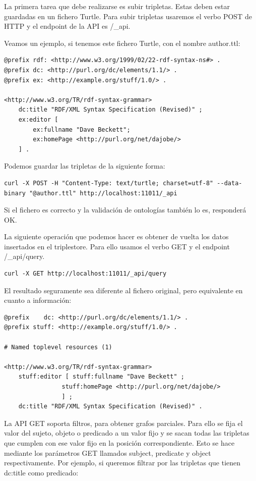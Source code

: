 \documentclass[12pt]{report} %
\begin{document}
La primera tarea que debe realizarse es subir tripletas. Estas deben estar guardadas en un fichero Turtle. Para subir tripletas usaremos el verbo POST de HTTP y el endpoint de la API es /\_api.

Veamos un ejemplo, si tenemos este fichero Turtle, con el nombre author.ttl:

\begin{lstlisting}
@prefix rdf: <http://www.w3.org/1999/02/22-rdf-syntax-ns#> .
@prefix dc: <http://purl.org/dc/elements/1.1/> .
@prefix ex: <http://example.org/stuff/1.0/> .

<http://www.w3.org/TR/rdf-syntax-grammar>
    dc:title "RDF/XML Syntax Specification (Revised)" ;
    ex:editor [
        ex:fullname "Dave Beckett";
        ex:homePage <http://purl.org/net/dajobe/>
    ] .
\end{lstlisting}

Podemos guardar las tripletas de la siguiente forma:
\begin{verbatim}
curl -X POST -H "Content-Type: text/turtle; charset=utf-8" --data-binary "@author.ttl" http://localhost:11011/_api
\end{verbatim}

Si el fichero es correcto y la validación de ontologías también lo es, responderá OK.

La siguiente operación que podemos hacer es obtener de vuelta los datos insertados en el triplestore. Para ello usamos el verbo GET y el endpoint /\_api/query.

\begin{verbatim}
curl -X GET http://localhost:11011/_api/query
\end{verbatim}

El resultado seguramente sea diferente al fichero original, pero equivalente en cuanto a información:
\begin{verbatim}                                                 
@prefix    dc: <http://purl.org/dc/elements/1.1/> .
@prefix stuff: <http://example.org/stuff/1.0/> .

# Named toplevel resources (1)

<http://www.w3.org/TR/rdf-syntax-grammar>
    stuff:editor [ stuff:fullname "Dave Beckett" ;
                stuff:homePage <http://purl.org/net/dajobe/>
                ] ;
    dc:title "RDF/XML Syntax Specification (Revised)" .
\end{verbatim}

La API GET soporta filtros, para obtener grafos parciales. Para ello se fija el valor del sujeto, objeto o predicado a un valor fijo y se sacan todas las tripletas que cumplen con ese valor fijo en la posición correspondiente. Esto se hace mediante los parámetros GET llamados subject, predicate y object respectivamente. Por ejemplo, si queremos filtrar por las tripletas que tienen dc:title como predicado:
\end{document}
